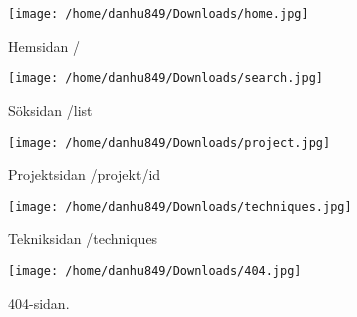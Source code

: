 \documentclass{TDP003mall}
\begin{document}
\begin{figure}[h]
  \centerline{\texttt{[image: /home/danhu849/Downloads/home.jpg]}}
  \caption{Hemsidan /}
  \label{fig}
\end{figure}

\begin{figure}[h]
  \centerline{\texttt{[image: /home/danhu849/Downloads/search.jpg]}}
  \caption{Söksidan /list}
  \label{fig}
\end{figure}

\begin{figure}[h]
  \centerline{\texttt{[image: /home/danhu849/Downloads/project.jpg]}}
  \caption{Projektsidan /projekt/id}
  \label{fig}
\end{figure}

\begin{figure}[h]
  \centerline{\texttt{[image: /home/danhu849/Downloads/techniques.jpg]}}
  \caption{Tekniksidan /techniques}
  \label{fig}
\end{figure}

\begin{figure}[h]
  \centerline{\texttt{[image: /home/danhu849/Downloads/404.jpg]}}
  \caption{404-sidan.}
  \label{fig}
\end{figure}
\end{document}
